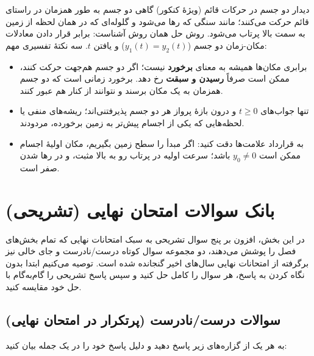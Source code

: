 \documentclass[12pt, a4paper]{article}
\begin{document}
\begin{tipbox}{دیدار دو جسم در حرکات قائم (ویژهٔ کنکور)}
گاهی دو جسم به طور همزمان در راستای قائم حرکت می‌کنند؛ مانند سنگی که رها می‌شود و گلوله‌ای که در همان لحظه از زمین به سمت بالا پرتاب می‌شود. روش حل همان روش آشناست: برابر قرار دادن معادلات مکان-زمان دو جسم ($y_1(t) = y_2(t)$) و یافتن $t$. سه نکتهٔ تفسیری مهم:
\begin{itemize}
    \item برابری مکان‌ها همیشه به معنای \textbf{برخورد} نیست؛ اگر دو جسم هم‌جهت حرکت کنند، ممکن است صرفاً \textbf{رسیدن و سبقت} رخ دهد. برخورد زمانی است که دو جسم همزمان به یک مکان برسند و نتوانند از کنار هم عبور کنند.
    \item تنها جواب‌های $t \ge 0$ و درون بازهٔ پرواز هر دو جسم پذیرفتنی‌اند؛ ریشه‌های منفی یا لحظه‌هایی که یکی از اجسام پیش‌تر به زمین برخورده، مردودند.
    \item به قرارداد علامت‌ها دقت کنید: اگر مبدأ را سطح زمین بگیریم، مکان اولیهٔ اجسام ممکن است $y_0 \neq 0$ باشد؛ سرعت اولیه در پرتاب رو به بالا مثبت، و در رها شدن صفر است.
\end{itemize}
\end{tipbox}

\section{بانک سوالات امتحان نهایی (تشریحی)}

در این بخش، افزون بر پنج سوال تشریحی به سبک امتحانات نهایی که تمام بخش‌های فصل را پوشش می‌دهند، دو مجموعه سوال کوتاه درست/نادرست و جای خالی نیز برگرفته از امتحانات نهایی سال‌های اخیر گنجانده شده است. توصیه می‌کنیم ابتدا بدون نگاه کردن به پاسخ، هر سوال را کامل حل کنید و سپس پاسخ تشریحی را گام‌به‌گام با حل خود مقایسه کنید.

\subsection{سوالات درست/نادرست (پرتکرار در امتحان نهایی)}
به هر یک از گزاره‌های زیر پاسخ دهید و دلیل پاسخ خود را در یک جمله بیان کنید:
\end{document}
